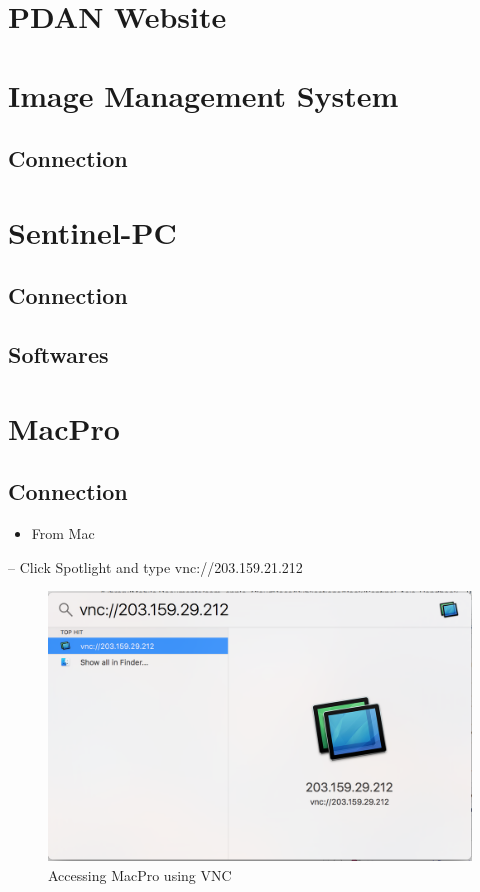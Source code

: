 \documentclass[]{book}
\providecommand{\tightlist}{%
  \setlength{\itemsep}{0pt}\setlength{\parskip}{0pt}}
\begin{document}
\section{PDAN Website}\label{pdan-website}

\section{Image Management System}\label{image-management-system}

\subsection{Connection}\label{connection}

\section{Sentinel-PC}\label{sentinel-pc}

\subsection{Connection}\label{connection-1}

\subsection{Softwares}\label{softwares-1}

\section{MacPro}\label{macpro}

\subsection{Connection}\label{connection-2}

\begin{itemize}
\tightlist
\item
  From Mac
\end{itemize}

-- Click Spotlight and type vnc://203.159.21.212

\begin{figure}

{\centering \includegraphics[width=0.7\linewidth]{img/fig41_vnc} 

}

\caption{Accessing MacPro using VNC}\label{fig:fig41a}
\end{figure}
\end{document}

